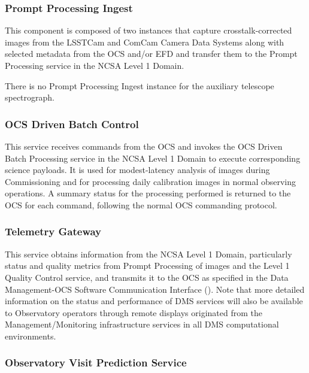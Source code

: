\documentclass[DM,toc]{lsstdoc}
\begin{document}
\subsubsection{Prompt Processing Ingest}\label{prompt-processing-ingest}

This component is composed of two instances that capture
crosstalk-corrected images from the LSSTCam and ComCam Camera Data
Systems along with selected metadata from the OCS and/or EFD and
transfer them to the Prompt Processing service in the NCSA Level
1 Domain.

There is no Prompt Processing Ingest instance for the auxiliary
telescope spectrograph.

\subsubsection{OCS Driven Batch Control}\label{ocs-driven-batch-control}

This service receives commands from the OCS and invokes the OCS Driven
Batch Processing service in the NCSA Level 1 Domain to execute
corresponding science payloads. It is used for modest-latency analysis
of images during Commissioning and for processing daily calibration
images in normal observing operations. A summary status for the
processing performed is returned to the OCS for each command, following
the normal OCS commanding protocol.

\subsubsection{Telemetry Gateway}\label{telemetry-gateway}

This service obtains information from the NCSA Level 1 Domain,
particularly status and quality metrics from Prompt Processing of images
and the Level 1 Quality Control service, and transmits it to the OCS as
specified in the Data Management-OCS Software Communication Interface
(). Note that more detailed information on the status and
performance of DMS services will also be available to Observatory
operators through remote displays originated from the
Management/Monitoring infrastructure services in all DMS computational
environments.

\subsubsection{Observatory Visit Prediction Service}\label{observatory-visit-prediction}
\end{document}

